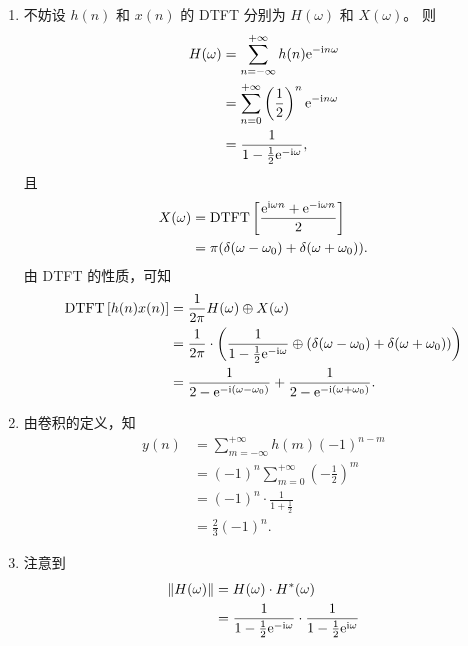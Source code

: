\begin{solution}
    \begin{enumerate}[label=(\arabic*)]
        \item 不妨设 $h(n)$ 和 $x(n)$ 的 DTFT 分别为 $H(\omega)$ 和 $X(\omega)$。
            则
            \begin{align*}
                H(\omega) & = \sum_{n = -\infty}^{+\infty}h(n)\mathrm{e}^{-\mathrm{i} n\omega} \\
                & = \sum_{n = 0}^{+\infty}\left(\frac{1}{2}\right)^n\mathrm{e}^{-\mathrm{i} n\omega} \\
                & = \frac{1}{1 - \frac{1}{2}\mathrm{e}^{-\mathrm{i}\omega}},
            \end{align*}
            且
            \begin{align*}
                X(\omega) & = \mathrm{DTFT}\left[\frac{\mathrm{e}^{\mathrm{i}\omega n} + \mathrm{e}^{-\mathrm{i}\omega n}}{2}\right] \\
                & = \pi(\delta(\omega - \omega_0) + \delta(\omega + \omega_0)).
            \end{align*}
            由 DTFT 的性质，可知
            \begin{align*}
                \mathrm{DTFT}\left[h(n)x(n)\right] & = \frac{1}{2\pi}H(\omega) \oplus X(\omega) \\
                & = \frac{1}{2\pi}\cdot\left(\frac{1}{1 - \frac{1}{2}\mathrm{e}^{-\mathrm{i}\omega}} \oplus (\delta(\omega - \omega_0) + \delta(\omega + \omega_0))\right) \\
                & = \frac{1}{2 - \mathrm{e}^{-\mathrm{i}(\omega - \omega_0)}} + \frac{1}{2 - \mathrm{e}^{-\mathrm{i}(\omega + \omega_0)}}.
            \end{align*}
        \item 由卷积的定义，知
            \begin{align*}
                y(n) & = \sum_{m = -\infty}^{+\infty}h(m)(-1)^{n-m} \\
                & = (-1)^n\sum_{m = 0}^{+\infty}\left(-\frac{1}{2}\right)^m \\
                & = (-1)^n\cdot \frac{1}{1 + \frac{1}{2}} \\
                & = \frac{2}{3}(-1)^n.
            \end{align*}
        \item 注意到
            \begin{align*}
                \|H(\omega)\| & = H(\omega) \cdot H^*(\omega) \\
                & = \frac{1}{1 - \frac{1}{2}\mathe^{-\mathi\omega}} \cdot \frac{1}{1 - \frac{1}{2}\mathe^{\mathi\omega}} \\

\end{align*}
\end{enumerate}
\end{solution}
